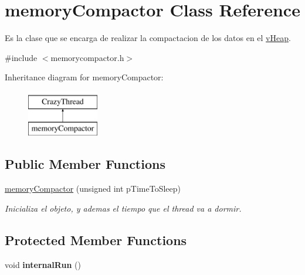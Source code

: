 \hypertarget{classmemory_compactor}{\section{memory\-Compactor Class Reference}
\label{classmemory_compactor}
}


Es la clase que se encarga de realizar la compactacion de los datos en el \hyperlink{classv_heap}{v\-Heap}.  




{\ttfamily \#include $<$memorycompactor.\-h$>$}

Inheritance diagram for memory\-Compactor\-:\begin{figure}[H]
\begin{center}
\leavevmode
\includegraphics[height=2.000000cm]{classmemory_compactor}
\end{center}
\end{figure}
\subsection*{Public Member Functions}
\begin{DoxyCompactItemize}
\item 
\hyperlink{classmemory_compactor_a4aafa6e4c651ff8c50ca2fc14e32d7eb}{memory\-Compactor} (unsigned int p\-Time\-To\-Sleep)
\begin{DoxyCompactList}\small\item\em Inicializa el objeto, y ademas el tiempo que el thread va a dormir. \end{DoxyCompactList}\end{DoxyCompactItemize}
\subsection*{Protected Member Functions}
\begin{DoxyCompactItemize}
\item 
\hypertarget{classmemory_compactor_ac7ff9969c2f8d4abddb85317aaba757e}{void {\bfseries internal\-Run} ()}\label{classmemory_compactor_ac7ff9969c2f8d4abddb85317aaba757e}

\end{DoxyCompactItemize}


